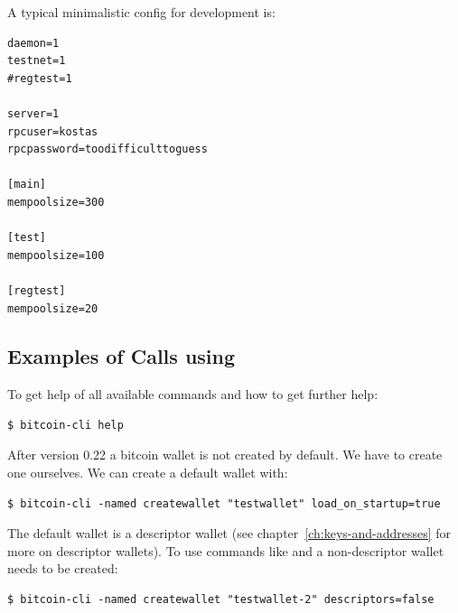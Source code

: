 A typical minimalistic config for development is:
\begin{emphbox}
\begin{lstlisting}[style=Bash]
daemon=1
testnet=1
#regtest=1

server=1
rpcuser=kostas
rpcpassword=toodifficulttoguess

[main]
mempoolsize=300

[test]
mempoolsize=100

[regtest]
mempoolsize=20
\end{lstlisting}
\end{emphbox}


\subsection*{Examples of Calls using }


To get help of all available commands and how to get further help:
\begin{emphbox}
\begin{lstlisting}[style=Bash]
$ bitcoin-cli help
\end{lstlisting}
\end{emphbox}
\vspace{1em}

After version 0.22 a bitcoin wallet is not created by default. We have to create one ourselves. We can create a default wallet with:

\begin{emphbox}
\begin{lstlisting}[style=Bash]
$ bitcoin-cli -named createwallet "testwallet" load_on_startup=true
\end{lstlisting}
\end{emphbox}
\vspace{1em}

\noindent The default wallet is a descriptor wallet (see chapter~\ref{ch:keys-and-addresses} for more on descriptor wallets). To use commands like  and  a non-descriptor wallet needs to be created:

\begin{emphbox}
\begin{lstlisting}[style=Bash]
$ bitcoin-cli -named createwallet "testwallet-2" descriptors=false
\end{lstlisting}
\end{emphbox}
\vspace{1em}



